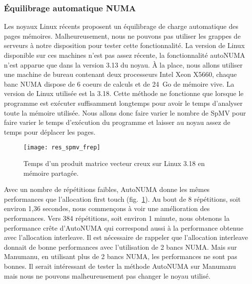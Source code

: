\subsubsection{\'Equilibrage automatique NUMA}
Les noyaux Linux récents proposent un équilibrage de charge automatique des pages mémoires.
%
Malheureusement, nous ne pouvons pas utiliser les grappes de serveurs à notre disposition pour tester cette fonctionnalité.
%
La version de Linux disponible sur ces machines n'est pas assez récente, la fonctionnalité autoNUMA n'est apparue que dans la version 3.13 du noyau.
%
\`A la place, nous allons utiliser une machine de bureau contenant deux processeurs Intel Xeon X5660, chaque banc NUMA dispose de 6 coeurs de calculs et de 24~Go de mémoire vive.
%
La version de Linux utilisée est la 3.18.
%
Cette méthode ne fonctionne que lorsque le programme est exécuter suffisamment longtemps pour avoir le temps d'analyser toute la mémoire utilisée.
%
Nous allons donc faire varier le nombre de SpMV pour faire varier le temps d'exécution du programme et laisser au noyau assez de temps pour déplacer les pages.


\begin{figure}[t!]
  \centering
  \texttt{[image: res\_spmv\_frep]}
  \caption{Temps d'un produit matrice vecteur creux sur Linux 3.18 en mémoire partagée.}
  \label{fig:res_spmv_frep}
\end{figure}


Avec un nombre de répétitions faibles, AutoNUMA donne les mêmes performances que l'allocation first touch (fig.~\ref{fig:res_spmv_frep}).
%
Au bout de 8 répétitions, soit environ 1,36 secondes, nous commençons à voir une amélioration des performances.
%
Vers 384 répétitions, soit environ 1 minute, nous obtenons la performance crête d'AutoNUMA qui correspond aussi à la performance obtenue avec l'allocation interleave.
%
Il est nécessaire de rappeler que l'allocation interleave donnait de bonne performances avec l'utilisation de 2 bancs NUMA.
%
Mais sur Manumanu, en utilisant plus de 2 bancs NUMA, les performances ne sont pas bonnes.
%
Il serait intéressant de tester la méthode AutoNUMA sur Manumanu mais nous ne pouvons malheureusement pas changer le noyau utilisé.
